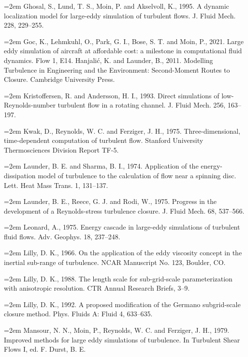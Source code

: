 \documentclass[12pt,a4paper,openany,fontset=none]{ctexbook}
\begin{document}
\par\hangindent=2em Ghosal, S., Lund, T. S., Moin, P. and Akselvoll, K., 1995. A dynamic localization model for large-eddy simulation of turbulent flows. J. Fluid Mech. 228, 229–255.
\par\hangindent=2em Goc, K., Lehmkuhl, O., Park, G. I., Bose, S. T. and Moin, P., 2021. Large eddy simulation of aircraft at affordable cost: a milestone in computational fluid dynamics. Flow 1, E14. Hanjalić, K. and Launder, B., 2011. Modelling Turbulence in Engineering and the Environment: Second-Moment Routes to Closure. Cambridge University Press.
\par\hangindent=2em Kristoffersen, R. and Andersson, H. I., 1993. Direct simulations of low-Reynolds-number turbulent flow in a rotating channel. J. Fluid Mech. 256, 163–197.
\par\hangindent=2em Kwak, D., Reynolds, W. C. and Ferziger, J. H., 1975. Three-dimensional, time-dependent computation of turbulent flow. Stanford University Thermosciences Division Report TF-5.
\par\hangindent=2em Launder, B. E. and Sharma, B. I., 1974. Application of the energy-dissipation model of turbulence to the calculation of flow near a spinning disc. Lett. Heat Mass Trans. 1, 131–137.
\par\hangindent=2em Launder, B. E., Reece, G. J. and Rodi, W., 1975. Progress in the development of a Reynolds-stress turbulence closure. J. Fluid Mech. 68, 537–566.
\par\hangindent=2em Leonard, A., 1975. Energy cascade in large-eddy simulations of turbulent fluid flows. Adv. Geophys. 18, 237–248.
\par\hangindent=2em Lilly, D. K., 1966. On the application of the eddy viscosity concept in the inertial sub-range of turbulence. NCAR Manuscript No. 123, Boulder, CO.
\par\hangindent=2em Lilly, D. K., 1988. The length scale for sub-grid-scale parameterization with anisotropic resolution. CTR Annual Research Briefs, 3–9.
\par\hangindent=2em Lilly, D. K., 1992. A proposed modification of the Germano subgrid-scale closure method. Phys. Fluids A: Fluid 4, 633–635.
\par\hangindent=2em Mansour, N. N., Moin, P., Reynolds, W. C. and Ferziger, J. H., 1979. Improved methods for large eddy simulations of turbulence. In Turbulent Shear Flows I, ed. F. Durst, B. E.
\end{document}
